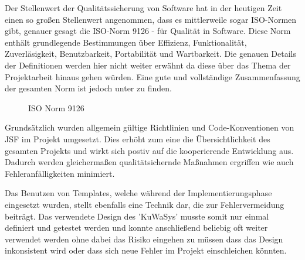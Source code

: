 Der Stellenwert der Qualitätssicherung von Software hat in der heutigen Zeit einen so großen Stellenwert angenommen, dass es mittlerweile sogar ISO-Normen gibt, genauer gesagt die ISO-Norm 9126 - für Qualität in Software. Diese Norm enthält grundlegende Bestimmungen über Effizienz, Funktionalität, Zuverläsigkeit, Benutzbarkeit, Portabilität und Wartbarkeit. 
Die genauen Details der Definitionen werden hier nicht weiter erwähnt da diese über das Thema der Projektarbeit hinaus gehen würden. Eine gute und vollständige Zusammenfassung der gesamten Norm ist jedoch unter \cite{WikiISO9126} zu finden.

\begin{figure}[H]
\centering{}
\caption[\textbf{ISO Norm 9126}]{ISO Norm 9126}
\label{fig:Projekt_Mindmap}
\end{figure}

Grundsätzlich wurden allgemein gültige Richtlinien und Code-Konventionen von JSF im Projekt umgesetzt. Dies erhöht zum eine die Übersichtlichkeit des gesamten Projekts und wirkt sich postiv auf die kooperierende Entwicklung aus. Dadurch werden gleichermaßen qualitätsichernde Maßnahmen ergriffen wie auch Fehleranfälligkeiten minimiert.  

Das Benutzen von Templates, welche während der Implementierungsphase eingesetzt wurden, stellt ebenfalls eine Technik dar, die zur Fehlervermeidung beiträgt. Das verwendete Design des 'KuWaSys' musste somit nur einmal definiert und getestet werden und konnte anschließend beliebig oft weiter verwendet werden ohne dabei das Risiko eingehen zu müssen dass das Design inkonsistent wird oder dass sich neue Fehler im Projekt einschleichen könnten. 


